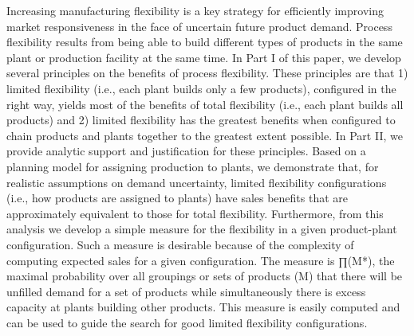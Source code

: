 Increasing manufacturing flexibility is a key strategy for efficiently improving market responsiveness in the face of uncertain future product demand. Process flexibility results from being able to build different types of products in the same plant or production facility at the same time. In Part I of this paper, we develop several principles on the benefits of process flexibility. These principles are that 1) limited flexibility (i.e., each plant builds only a few products), configured in the right way, yields most of the benefits of total flexibility (i.e., each plant builds all products) and 2) limited flexibility has the greatest benefits when configured to chain products and plants together to the greatest extent possible. In Part II, we provide analytic support and justification for these principles. Based on a planning model for assigning production to plants, we demonstrate that, for realistic assumptions on demand uncertainty, limited flexibility configurations (i.e., how products are assigned to plants) have sales benefits that are approximately equivalent to those for total flexibility. Furthermore, from this analysis we develop a simple measure for the flexibility in a given product-plant configuration. Such a measure is desirable because of the complexity of computing expected sales for a given configuration. The measure is ∏(M*), the maximal probability over all groupings or sets of products (M) that there will be unfilled demand for a set of products while simultaneously there is excess capacity at plants building other products. This measure is easily computed and can be used to guide the search for good limited flexibility configurations.
